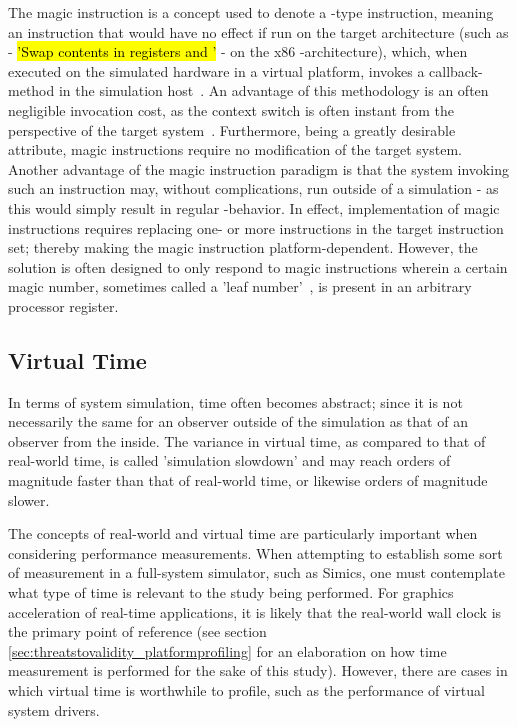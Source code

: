 The magic instruction is a concept used to denote a -type instruction, meaning an instruction that would have no effect if run on the target architecture (such as  - \hl{'Swap contents in registers  and '} - on the x86 -architecture), which, when executed on the simulated hardware in a virtual platform, invokes a callback-method in the simulation host~.
An advantage of this methodology is an often negligible invocation cost, as the context switch is often instant from the perspective of the target system~.
Furthermore, being a greatly desirable attribute, magic instructions require no modification of the target system.
Another advantage of the magic instruction paradigm is that the system invoking such an instruction may, without complications, run outside of a simulation - as this would simply result in regular -behavior.
In effect, implementation of magic instructions requires replacing one- or more instructions in the target instruction set; thereby making the magic instruction platform-dependent.
However, the solution is often designed to only respond to magic instructions wherein a certain magic number, sometimes called a 'leaf number'~, is present in an arbitrary processor register.

\subsection{Virtual Time}
\label{sec:backgroundandrelatedwork_virtualtime}
In terms of system simulation, time often becomes abstract; since it is not necessarily the same for an observer outside of the simulation as that of an observer from the inside.
The variance in virtual time, as compared to that of real-world time, is called 'simulation slowdown' and may reach orders of magnitude faster than that of real-world time, or likewise orders of magnitude slower.

The concepts of real-world and virtual time are particularly important when considering performance measurements.
When attempting to establish some sort of measurement in a full-system simulator, such as Simics, one must contemplate what type of time is relevant to the study being performed.
For graphics acceleration of real-time applications, it is likely that the real-world wall clock is the primary point of reference (see section \ref{sec:threatstovalidity_platformprofiling} for an elaboration on how time measurement is performed for the sake of this study).
However, there are cases in which virtual time is worthwhile to profile, such as the performance of virtual system drivers.
